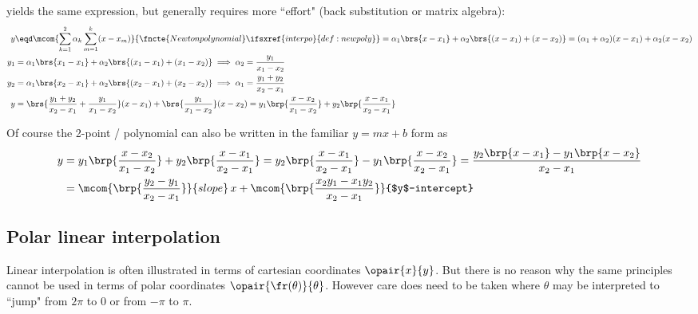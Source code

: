  yields the same expression, 
but generally requires more ``effort" (back substitution or matrix algebra):
\begin{align*}
  y   &\eqd%
        \mcom{\sum_{k=1}^2\alpha_k\sum_{m=1}^k(x-x_m)}{\fncte{Newton polynomial}\ifsxref{interpo}{def:newpoly}}
          = \alpha_1\brs{x-x_1} + \alpha_2\brs{(x-x_1)+(x-x_2)}
          = (\alpha_1+\alpha_2)(x-x_1) + \alpha_2(x-x_2)
    \\
  y_1 &= \alpha_1\brs{x_1-x_1} + \alpha_2\brs{(x_1-x_1)+(x_1-x_2)}
       \implies \alpha_2 = \frac{y_1}{x_1-x_2}
    \\
  y_2 &= \alpha_1\brs{x_2-x_1} + \alpha_2\brs{(x_2-x_1)+(x_2-x_2)}
       \implies \alpha_1 = \frac{y_1+y_2}{x_2-x_1}
    \\
  y   &= %
           \brs{\frac{y_1+y_2}{x_2-x_1}+\frac{y_1}{x_1-x_2}}(x-x_1) + \brs{\frac{y_1}{x_1-x_2}}(x-x_2)
           = y_1\brp{\frac{x-x_2}{x_1-x_2}} + y_2\brp{\frac{x-x_1}{x_2-x_1}} 
\end{align*}

Of course the 2-point / polynomial can 
also be written in the familiar  $y=mx+b$ form as
\begin{align*}
  y   
    &= y_1\brp{\frac{x-x_2}{x_1-x_2}} + y_2\brp{\frac{x-x_1}{x_2-x_1}} 
     = y_2\brp{\frac{x-x_1}{x_2-x_1}} - y_1\brp{\frac{x-x_2}{x_2-x_1}} 
     = \frac{y_2\brp{x-x_1} - y_1\brp{x-x_2}}{x_2-x_1}
  \\&= \mcom{\brp{\frac{y_2-y_1}{x_2-x_1}}}{slope}\,x + \mcom{\brp{\frac{x_2y_1-x_1y_2}{x_2-x_1}}}{$y$-intercept}
\end{align*}

\subsection{Polar linear interpolation}
Linear interpolation is often illustrated in terms of cartesian coordinates $\opair{x}{y}$.
But there is no reason why the same principles cannot be used in terms of polar coordinates $\opair{\fr(\theta)}{\theta}$.
However care does need to be taken where $\theta$ may be interpreted to ``jump" from $2\pi$ to $0$ 
or from $-\pi$ to $\pi$.

